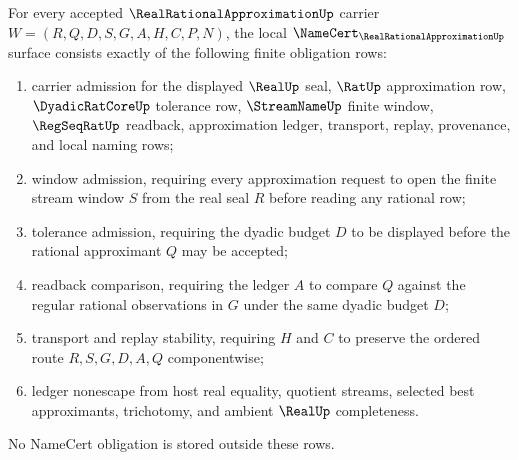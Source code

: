 \begin{theorem}
\label{thm:real-rational-approximation-namecert-obligations}
For every accepted $\RealRationalApproximationUp$ carrier $W=(R,Q,D,S,G,A,H,C,P,N)$, the local $\NameCert_{\RealRationalApproximationUp}$ surface consists exactly of the following finite obligation rows:
\begin{enumerate}
\item carrier admission for the displayed $\RealUp$ seal, $\RatUp$ approximation row, $\DyadicRatCoreUp$ tolerance row, $\StreamNameUp$ finite window, $\RegSeqRatUp$ readback, approximation ledger, transport, replay, provenance, and local naming rows;
\item window admission, requiring every approximation request to open the finite stream window $S$ from the real seal $R$ before reading any rational row;
\item tolerance admission, requiring the dyadic budget $D$ to be displayed before the rational approximant $Q$ may be accepted;
\item readback comparison, requiring the ledger $A$ to compare $Q$ against the regular rational observations in $G$ under the same dyadic budget $D$;
\item transport and replay stability, requiring $H$ and $C$ to preserve the ordered route $R,S,G,D,A,Q$ componentwise;
\item ledger nonescape from host real equality, quotient streams, selected best approximants, trichotomy, and ambient $\RealUp$ completeness.
\end{enumerate}
No NameCert obligation is stored outside these rows.
\end{theorem}
